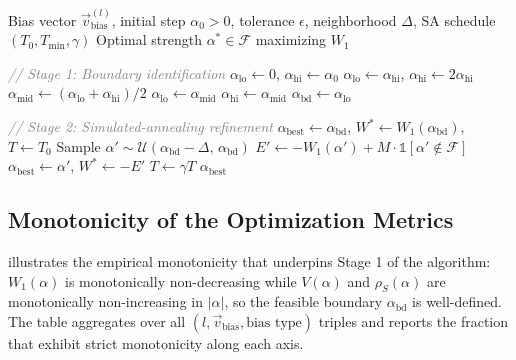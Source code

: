 \documentclass[11pt]{article}
\let\Cref\crtCref
\begin{document}
\begin{algorithm}[h!]
\caption{Two-stage search for optimal activation-steering strength.}
\label{alg:alpha_search}
\begin{algorithmic}[1]
\REQUIRE Bias vector $\vec{v}_{\text{bias}}^{(l)}$, initial step $\alpha_0 > 0$, tolerance $\epsilon$, neighborhood $\Delta$, SA schedule $(T_0, T_{\min}, \gamma)$
\ENSURE Optimal strength $\alpha^{*} \in \mathcal{F}$ maximizing $W_1$

\STATE \textcolor{gray}{\emph{// Stage 1: Boundary identification}}
\STATE $\alpha_{\text{lo}} \gets 0$, $\alpha_{\text{hi}} \gets \alpha_0$
    \STATE $\alpha_{\text{lo}} \gets \alpha_{\text{hi}}$, $\alpha_{\text{hi}} \gets 2\alpha_{\text{hi}}$ 
\ENDWHILE
{}
    \STATE $\alpha_{\text{mid}} \gets (\alpha_{\text{lo}} + \alpha_{\text{hi}})/2$
        \STATE $\alpha_{\text{lo}} \gets \alpha_{\text{mid}}$
    \ELSE
        \STATE $\alpha_{\text{hi}} \gets \alpha_{\text{mid}}$
    \ENDIF
\ENDWHILE
\STATE $\alpha_{\text{bd}} \gets \alpha_{\text{lo}}$

\STATE \textcolor{gray}{\emph{// Stage 2: Simulated-annealing refinement}}
\STATE $\alpha_{\text{best}} \gets \alpha_{\text{bd}}$, $W^{*} \gets W_1(\alpha_{\text{bd}})$, $T \gets T_0$
    \STATE Sample $\alpha' \sim \mathcal{U}(\alpha_{\text{bd}} - \Delta,\, \alpha_{\text{bd}})$
    \STATE $E' \gets -W_1(\alpha') + M \cdot \mathbb{1}[\alpha' \notin \mathcal{F}]$
        \STATE $\alpha_{\text{best}} \gets \alpha'$, $W^{*} \gets -E'$
    \ENDIF
    \STATE $T \gets \gamma T$
\ENDWHILE
\RETURN $\alpha_{\text{best}}$
\end{algorithmic}
\end{algorithm}

\subsection{Monotonicity of the Optimization Metrics}
\label{app:alpha_monotone}

\Cref{tab:alpha_monotone} illustrates the empirical monotonicity that underpins Stage 1 of the algorithm: $W_1(\alpha)$ is monotonically non-decreasing while $V(\alpha)$ and $\rho_S(\alpha)$ are monotonically non-increasing in $|\alpha|$, so the feasible boundary $\alpha_{\text{bd}}$ is well-defined. The table aggregates over all $(l, \vec{v}_{\text{bias}}, \text{bias type})$ triples and reports the fraction that exhibit strict monotonicity along each axis.
\end{document}
